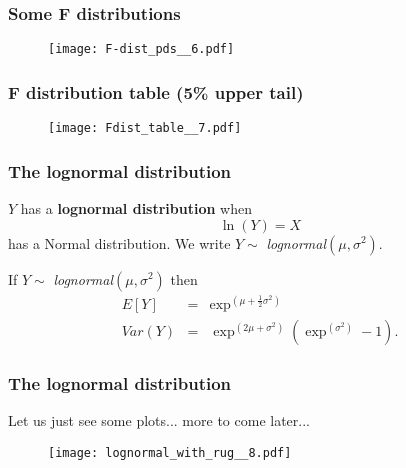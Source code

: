 \documentclass[notes=show,smaller,handout]{beamer}\usepackage[]{graphicx}\usepackage[]{color}
\begin{document}
\begin{frame}
\frametitle{Some F distributions}

\begin{figure}[ptb]\centering
\texttt{[image: F-dist\_pds\_\_6.pdf]}%
\end{figure}%
\end{frame}%

\begin{frame}
\frametitle{F distribution table (5\% upper tail)}


\begin{figure}[ptb]\centering
\texttt{[image: Fdist\_table\_\_7.pdf]}%
\end{figure}%

\end{frame}%




\begin{frame}%

\frametitle{The lognormal distribution}

\begin{definition}
 $Y$ has a \textbf{lognormal distribution} when
 $$\ln \left( Y\right) =X$$
has a Normal distribution. We write $Y\sim $ \emph{lognormal}$\left( \mu ,\sigma ^{2}\right) $.
\end{definition}

\vspace{0.4cm}

If $Y\sim $ \emph{lognormal}$\left( \mu ,\sigma ^{2}\right) $ then%
\begin{eqnarray*}
E\left[ Y\right] &=&\exp^{ \left( \mu +\frac{1}{2}\sigma ^{2}\right)} \\
Var(Y) &=&\exp^{ \left( 2\mu +\sigma ^{2}\right)} \left( \exp^{ \left( \sigma
^{2}\right)} -1\right).
\end{eqnarray*}


\end{frame}%


\begin{frame}%

\frametitle{The lognormal distribution}


Let us just see some plots... more to come later...
\begin{figure}[ptb]\centering
\texttt{[image: lognormal\_with\_rug\_\_8.pdf]}%
\end{figure}%

\end{frame}%
\end{document}
